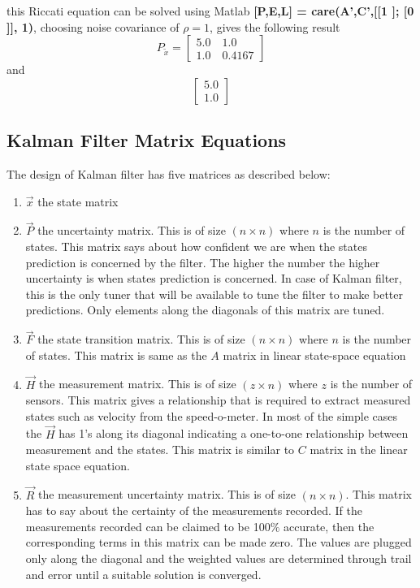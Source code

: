 this Riccati equation can be solved using Matlab \textbf{[P,E,L] = care(A',C',[[1 ]; [0 ]], 1)}, choosing noise covariance of $\rho = 1$, gives the following result
$$P_{\tilde{x}} = \begin{bmatrix}
5.0 \quad 1.0 \\ 1.0 \quad 0.4167
\end{bmatrix}$$ and
$$\begin{bmatrix}
5.0 \\ 1.0
\end{bmatrix}$$

\subsection{Kalman Filter Matrix Equations}

The design of Kalman filter has five matrices as described below:
\begin{enumerate}
	\item $\vec{x}$ the state matrix
	\item $\vec{P}$ the uncertainty matrix. This is of size $(n \times n)$ where $n$ is the number of states. This matrix says about how confident we are when the states prediction is concerned by the filter. The higher the number the higher uncertainty is when states prediction is concerned. In case of Kalman filter, this is the only tuner that will be available to tune the filter to make better predictions. Only elements along the diagonals of this matrix are tuned.
	\item $\vec{F}$ the state transition matrix. This is of size $(n \times n)$ where $n$ is the number of states. This matrix is same as the $A$ matrix in linear state-space equation 
	\item $\vec{H}$ the measurement matrix. This is of size $(z \times n)$ where $z$ is the number of sensors. This matrix gives a relationship that is required to extract measured states such as velocity from the speed-o-meter. In most of the simple cases the  $\vec{H}$ has 1's along its diagonal indicating a one-to-one relationship between measurement and the states. This matrix is similar to $C$ matrix in the linear state space equation.
	\item $\vec{R}$ the measurement uncertainty matrix. This is of size $(n \times n)$. This matrix has to say about the certainty of the measurements recorded. If the measurements recorded can be claimed to be 100$\%$ accurate, then the corresponding terms in this matrix can be made zero. The values are plugged only along the diagonal and the weighted values are determined through trail and error until a suitable solution is converged.  
\end{enumerate}

